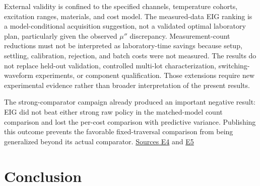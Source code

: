 External validity is confined to the specified channels, temperature
cohorts, excitation ranges, materials, and cost model. The measured-data
EIG ranking is a model-conditional acquisition suggestion, not a
validated optimal laboratory plan, particularly given the observed
\(\mu''\) discrepancy. Measurement-count reductions must not be
interpreted as laboratory-time savings because setup, settling,
calibration, rejection, and batch costs were not measured. The results
do not replace held-out validation, controlled multi-lot
characterization, switching-waveform experiments, or component
qualification. Those extensions require new experimental evidence rather
than broader interpretation of the present results.

The strong-comparator campaign already produced an important negative
result: EIG did not beat either strong raw policy in the matched-model
count comparison and lost the per-cost comparison with predictive
variance. Publishing this outcome prevents the favorable fixed-traversal
comparison from being generalized beyond its actual comparator.
\href{https://github.com/hoangduong6210/EIG-bayesian-for-Recover-potential-Physical-Parameter-of-MagComponent/blob/a3e6326621d90123e5661c17e2d562fb0f5e0a41/wiki/evidence/Evidence-Sources.md\#e4}{Sources
E4} and
\href{https://github.com/hoangduong6210/EIG-bayesian-for-Recover-potential-Physical-Parameter-of-MagComponent/blob/a3e6326621d90123e5661c17e2d562fb0f5e0a41/wiki/evidence/Evidence-Sources.md\#e5}{E5}

\hypertarget{conclusion}{%
\section{Conclusion}\label{conclusion}}

